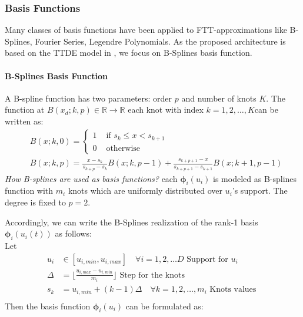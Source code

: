 \documentclass[11pt]{article}
\begin{document}
    \subsubsection{Basis Functions}
    Many classes of basis functions have been applied to FTT-approximations like B-Splines, Fourier Series,
    \cite{novikov2022tensortrain} Legendre Polynomials\cite{sommer2024generative}.
    As the proposed architecture is based on the TTDE model in \cite{novikov2022tensortrain},
    we focus on B-Splines basis function.

    \paragraph{B-Splines Basis Function} A B-spline function has two parameters: order $p$ and number of knots $K$.
    The function at $B(x_d;k,p) \in \mathbb{R} \rightarrow \mathbb{R}$ each knot with index $k=1,2,\dots,K$can be written as:
    \begin{equation}
        \begin{aligned}
            & B(x;k,0)=
            \begin
            {cases}
                1 & \text { if } s_k \leq x<s_{k+1} \\ 0 & \text { otherwise }
            \end{cases} \\ & B(x;k,p)=\frac{x-s_k}{s_{k+p}-s_k} B(x;k,p-1)+\frac{s_{k+p+1}-x}{s_{k+p+1}-s_{k+1}} B(x;k+1, p-1)
        \end{aligned}\label{eq:b-splines-basis}
    \end{equation}
    \textit{How B-splines are used as basis functions?}
    each $\bm{\phi}_i(u_i)$ is modeled as B-splines function with $m_i$ knots which are uniformly distributed over $u_i$'s support.
    The degree is fixed to $p=2$\cite{novikov2022tensortrain}.


    Accordingly, we can write the B-Splines realization of the rank-1 basis $\bm{\phi}_i(u_i(t))$ as follows:\\
    Let
    \begin{align*}
        u_i &\in [u_{i,min},u_{i,max}] \quad \forall i=1,2,\dots D  \text{ Support for } u_i\\
        \Delta &=\lfloor \frac{u_{i,max}-u_{i,min}}{m_i} \rfloor \text{ Step for the knots }\\
        s_{k} &= u_{i,min} + (k-1)\Delta \quad \forall k=1,2,\dots,m_i \text{ Knots values }\\
    \end{align*}
    Then the basis function $\bm{\phi}_i(u_i)$ can be formulated as:
\end{document}
